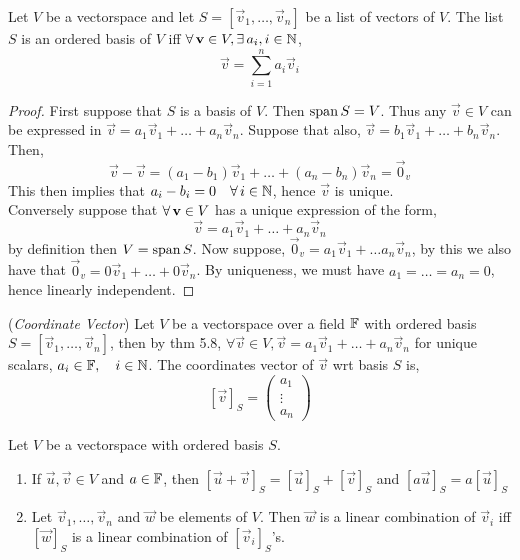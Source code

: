 \documentclass{article}
\begin{document}
\begin{nthm}
  Let $V$ be a vectorspace and let $S = [\vec v_1, \dots, \vec v_n]$ be a list of vectors of $V$. The list $S$ is an ordered basis of $V$ iff $\forall\, \boldsymbol{\mathbf{v}} \in V, \exists\, a_i, i \in \mathbb{N}$,
  $$ \vec v = \sum_{i=1}^n a_i\vec v_i $$
\end{nthm}
\begin{proof}
  First suppose that $S$ is a basis of $V$. Then $\operatorname{span} S = V$. Thus any $\vec v \in V$ can be expressed in $\vec v = a_1\vec v_1 + \dots + a_n\vec v_n$. Suppose that also, $\vec v = b_1\vec v_1 + \dots + b_n\vec v_n$. Then,
  $$ \vec v - \vec v = (a_1 - b_1)\vec v_1 + \dots + (a_n - b_n )\vec v_n  = \vec 0_v$$
  This then implies that $a_i - b_i = 0 \quad\forall\, i\in\mathbb{N}$, hence $\vec v$ is unique.\\
  Conversely suppose that $\forall\, \boldsymbol{\mathbf{v}} \in V$ has a unique expression of the form,
  $$ \vec v = a_1\vec v_1 + \dots + a_n\vec v_n $$
  by definition then $V = \operatorname{span} S$. Now suppose, $\vec 0_v = a_1\vec v_1 + \dots a_n\vec v_n$, by this we also have that $\vec 0_v = 0\vec v_1 + \dots + 0\vec v_n$. By uniqueness, we must have $a_1=\dots=a_n=0$, hence linearly independent.
\end{proof}

\begin{ndefi}{(\textit{Coordinate Vector})}
  Let $V$ be a vectorspace over a field $\mathbb{F}$ with ordered basis $S = [\vec v_1, \dots, \vec v_n]$, then by thm 5.8, $\forall \vec v \in V, \vec v = a_1\vec v_1 + \dots + a_n\vec v_n$ for unique scalars, $a_i\in\mathbb{F}, \quad i\in\mathbb{N}$. The coordinates vector of $\vec v$ wrt basis $S$ is,
  $$ [\vec v]_S = \begin{pmatrix}
    a_1\\\vdots\\a_n
  \end{pmatrix} $$
\end{ndefi}

\begin{nthm}
  Let $V$ be a vectorspace with ordered basis $S$.
  \begin{enumerate}
    \item If $\vec u, \vec v \in V$ and $a\in\mathbb{F}$, then $[\vec u + \vec v]_S = [\vec u]_S + [\vec v]_S$ and $[a\vec u]_S = a[\vec u]_S$
    \item Let $\vec v_1, \dots, \vec v_n$ and $\vec w$ be elements of $V$. Then $\vec w$ is a linear combination of $\vec v_i$ iff $[\vec w]_S$ is a linear combination of $[\vec v_i]_S$'s.
  \end{enumerate}
\end{nthm}
\end{document}
